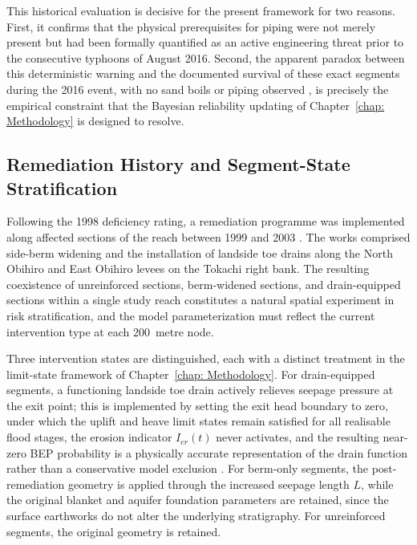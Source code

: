 This historical evaluation is decisive for the present framework for two reasons. First, it confirms that the physical prerequisites for piping were not merely present but had been formally quantified as an active engineering threat prior to the consecutive typhoons of August 2016. Second, the apparent paradox between this deterministic warning and the documented survival of these exact segments during the 2016 event, with no sand boils or piping observed \parencite{tokachi_levee_committee_2017}, is precisely the empirical constraint that the Bayesian reliability updating of Chapter~\ref{chap: Methodology} is designed to resolve.

\subsection{Remediation History and Segment-State Stratification}
\label{subsec: Remediation History and Segment-State Stratification}

Following the 1998 deficiency rating, a remediation programme was implemented along affected sections of the reach between 1999 and 2003 \parencite{fukuda_2025_internal}. The works comprised side-berm widening and the installation of landside toe drains along the North Obihiro and East Obihiro levees on the Tokachi right bank. The resulting coexistence of unreinforced sections, berm-widened sections, and drain-equipped sections within a single study reach constitutes a natural spatial experiment in risk stratification, and the model parameterization must reflect the current intervention type at each 200~metre node.

Three intervention states are distinguished, each with a distinct treatment in the limit-state framework of Chapter~\ref{chap: Methodology}. For drain-equipped segments, a functioning landside toe drain actively relieves seepage pressure at the exit point; this is implemented by setting the exit head boundary to zero, under which the uplift and heave limit states remain satisfied for all realisable flood stages, the erosion indicator $I_{er}(t)$ never activates, and the resulting near-zero BEP probability is a physically accurate representation of the drain function rather than a conservative model exclusion \parencite{ENW2017}. For berm-only segments, the post-remediation geometry is applied through the increased seepage length $L$, while the original blanket and aquifer foundation parameters are retained, since the surface earthworks do not alter the underlying stratigraphy. For unreinforced segments, the original geometry is retained.

